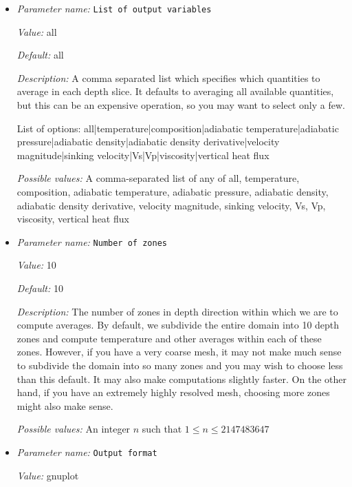\begin{itemize}
\item {\it Parameter name:} {\tt List of output variables}
\label{parameters:Postprocess/Depth average/List of output variables}


{\it Value:} all


{\it Default:} all


{\it Description:} A comma separated list which specifies which quantities to average in each depth slice. It defaults to averaging all available quantities, but this can be an expensive operation, so you may want to select only a few.

List of options:
all|temperature|composition|adiabatic temperature|adiabatic pressure|adiabatic density|adiabatic density derivative|velocity magnitude|sinking velocity|Vs|Vp|viscosity|vertical heat flux


{\it Possible values:} A comma-separated list of any of all, temperature, composition, adiabatic temperature, adiabatic pressure, adiabatic density, adiabatic density derivative, velocity magnitude, sinking velocity, Vs, Vp, viscosity, vertical heat flux
\item {\it Parameter name:} {\tt Number of zones}
\label{parameters:Postprocess/Depth average/Number of zones}


{\it Value:} 10


{\it Default:} 10


{\it Description:} The number of zones in depth direction within which we are to compute averages. By default, we subdivide the entire domain into 10 depth zones and compute temperature and other averages within each of these zones. However, if you have a very coarse mesh, it may not make much sense to subdivide the domain into so many zones and you may wish to choose less than this default. It may also make computations slightly faster. On the other hand, if you have an extremely highly resolved mesh, choosing more zones might also make sense.


{\it Possible values:} An integer $n$ such that $1\leq n \leq 2147483647$
\item {\it Parameter name:} {\tt Output format}
\label{parameters:Postprocess/Depth average/Output format}


{\it Value:} gnuplot



\end{itemize}
